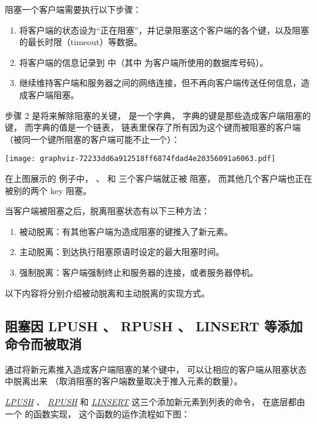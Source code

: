 \documentclass[a4paper,11pt,english]{sphinxmanual}
\begin{document}
阻塞一个客户端需要执行以下步骤：
\begin{enumerate}
\item {} 
将客户端的状态设为“正在阻塞”，并记录阻塞这个客户端的各个键，以及阻塞的最长时限（timeout）等数据。

\item {} 
将客户端的信息记录到  中（其中  为客户端所使用的数据库号码）。

\item {} 
继续维持客户端和服务器之间的网络连接，但不再向客户端传送任何信息，造成客户端阻塞。

\end{enumerate}

步骤 2 是将来解除阻塞的关键，
 是一个字典，
字典的键是那些造成客户端阻塞的键，
而字典的值是一个链表，
链表里保存了所有因为这个键而被阻塞的客户端
（被同一个键所阻塞的客户端可能不止一个）：

\texttt{[image: graphviz-72233dd6a912518ff6874fdad4e20356091a6063.pdf]}

在上图展示的  例子中，  、  和  三个客户端就正被  阻塞，
而其他几个客户端也正在被别的两个 key 阻塞。

当客户端被阻塞之后，脱离阻塞状态有以下三种方法：
\begin{enumerate}
\item {} 
被动脱离：有其他客户端为造成阻塞的键推入了新元素。

\item {} 
主动脱离：到达执行阻塞原语时设定的最大阻塞时间。

\item {} 
强制脱离：客户端强制终止和服务器的连接，或者服务器停机。

\end{enumerate}

以下内容将分别介绍被动脱离和主动脱离的实现方式。


\subsection{阻塞因 LPUSH 、 RPUSH 、 LINSERT 等添加命令而被取消}
\label{datatype/list:lpush-rpush-linsert}
通过将新元素推入造成客户端阻塞的某个键中，
可以让相应的客户端从阻塞状态中脱离出来
（取消阻塞的客户端数量取决于推入元素的数量）。

\href{http://redis.readthedocs.org/en/latest/list/lpush.html\#lpush}{\emph{LPUSH}} 、 \href{http://redis.readthedocs.org/en/latest/list/rpush.html\#rpush}{\emph{RPUSH}} 和 \href{http://redis.readthedocs.org/en/latest/list/linsert.html\#linsert}{\emph{LINSERT}} 这三个添加新元素到列表的命令，
在底层都由一个  的函数实现，
这个函数的运作流程如下图：
\end{document}
